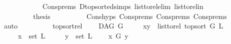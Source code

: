 \begin{isabellebody}
\ \ \ \ \ \ \ \ \ \ \ \ Cons{\isachardot}{\kern0pt}prems{\isacharparenleft}{\kern0pt}{}{\isacharparenright}{\kern0pt}\ D{\isachardot}{\kern0pt}top{\isacharunderscore}{\kern0pt}sorted{\isachardot}{\kern0pt}simps{\isacharparenleft}{\kern0pt}{}{\isacharparenright}{\kern0pt}\ list{\isacharunderscore}{\kern0pt}to{\isacharunderscore}{\kern0pt}rel{\isacharunderscore}{\kern0pt}elim\ list{\isacharunderscore}{\kern0pt}to{\isacharunderscore}{\kern0pt}rel{\isacharunderscore}{\kern0pt}in{\isacharparenright}{\kern0pt}\ \isanewline
\ \ \ \ \isamarkupfalse%
\isanewline
\ \ \ \ \ \ \isamarkupfalse%
\ {}\isanewline
\ \ \ \ \ \ \isamarkupfalse%
\ \isamarkupfalse%
\ {\isacharquery}{\kern0pt}thesis\isanewline
\ \ \ \ \ \ \ \ \isamarkupfalse%
\ Cons{\isachardot}{\kern0pt}hyps\ Cons{\isachardot}{\kern0pt}prems{\isacharparenleft}{\kern0pt}{}{\isacharparenright}{\kern0pt}\ Cons{\isachardot}{\kern0pt}prems{\isacharparenleft}{\kern0pt}{}{\isacharparenright}{\kern0pt}\ Cons{\isachardot}{\kern0pt}prems{\isacharparenleft}{\kern0pt}{}{\isacharparenright}{\kern0pt}\ \isamarkupfalse%
\ auto\ \isanewline
\ \ \ \ \isamarkupfalse%
\isanewline
\ \ \isamarkupfalse%
\isanewline
{}\isamarkupfalse%
%
\endisatagproof
{\isafoldproof}%
%
\isadelimproof
\isanewline
%
\endisadelimproof
\isanewline
\isanewline
{}\isamarkupfalse%
\ top{\isacharunderscore}{\kern0pt}sort{\isacharunderscore}{\kern0pt}rel{}{\isacharcolon}{\kern0pt}\ \isanewline
\ \ \ {\isachardoublequoteopen}DAG\ G{\isachardoublequoteclose}\isanewline
\ \ \ \ \ {\isachardoublequoteopen}{\isacharparenleft}{\kern0pt}x{\isacharcomma}{\kern0pt}y{\isacharparenright}{\kern0pt}\ {\isasymin}\ list{\isacharunderscore}{\kern0pt}to{\isacharunderscore}{\kern0pt}rel\ {\isacharparenleft}{\kern0pt}top{\isacharunderscore}{\kern0pt}sort\ G\ L{\isacharparenright}{\kern0pt}{\isachardoublequoteclose}\isanewline
\ \ \ \ \ {\isachardoublequoteopen}x\ {\isasymin}\ set\ L{\isachardoublequoteclose}\isanewline
\ \ \ \ \ {\isachardoublequoteopen}y\ {\isasymin}\ set\ L{\isachardoublequoteclose}\isanewline
\ \ \ {\isachardoublequoteopen}{\isasymnot}\ x\ {\isasymrightarrow}\isactrlsup {\isacharplus}{\kern0pt}\isactrlbsub G\isactrlesub \ y{\isachardoublequoteclose}\isanewline
%
\isadelimproof
\ \ %
\endisadelimproof
%
\isatagproof
{}\isamarkupfalse%

\end{isabellebody}
